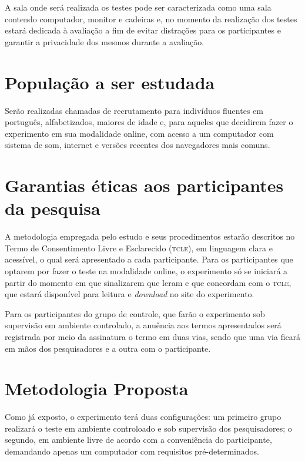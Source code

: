 \documentclass[a4paper,11pt,titlepage,singlespacing]{article}
\begin{document}
A sala onde será realizada os testes pode ser caracterizada como uma sala contendo computador, monitor e cadeiras e, no momento da realização dos testes estará dedicada à avaliação a fim de evitar distrações para os participantes e garantir a privacidade dos mesmos durante a avaliação.

\section{População a ser estudada}

\noindent Serão realizadas chamadas de recrutamento para indivíduos fluentes em português, alfabetizados, maiores de idade e, para aqueles que decidirem fazer o experimento em sua modalidade online, com acesso a um computador com sistema de som, internet e versões recentes dos navegadores mais comuns.

\section{Garantias éticas aos participantes da pesquisa}
\noindent A metodologia empregada pelo estudo e seus procedimentos estarão descritos no Termo de Consentimento Livre e Esclarecido (\textsc{tcle}), em linguagem clara e acessível, o qual será apresentado a cada participante. Para os participantes que optarem por fazer o teste na modalidade online, o experimento só se iniciará a partir do momento em que sinalizarem que leram e que concordam com o \textsc{tcle}, que estará disponível para leitura e \textit{download} no site do experimento. 

Para os participantes do grupo de controle, que farão o experimento sob supervisão em ambiente controlado, a anuência aos termos apresentados será registrada por meio da assinatura o termo em duas vias, sendo que uma via ficará em mãos dos pesquisadores e a outra com o participante.



\section{Metodologia Proposta}

\noindent Como já exposto, o experimento terá duas configurações: um primeiro grupo realizará o teste em ambiente controloado e sob supervisão dos pesquisadores; o segundo, em ambiente livre de acordo com a conveniência do participante, demandando apenas um computador com requisitos pré-determinados.
\end{document}
